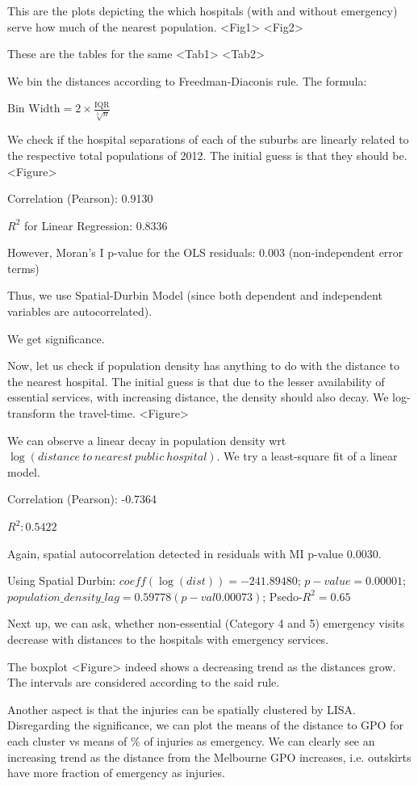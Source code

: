 \documentclass[
	a4paper, %
	10pt, %
	unnumberedsections, %
	twoside, %
]{LTJournalArticle}
\begin{document}
This are the plots depicting the which hospitals (with and without emergency) serve how much of the nearest population. <Fig1> <Fig2>

These are the tables for the same <Tab1> <Tab2>

We bin the distances according to Freedman-Diaconis rule. The formula:

$\text{Bin Width} = 2 \times \frac{\text{IQR}}{\sqrt[3]{n}}$




We check if the hospital separations of each of the suburbs are linearly related to the respective total populations of 2012. The initial guess is that they should be. <Figure>

Correlation (Pearson): 0.9130

$R^2$ for Linear Regression: 0.8336

However, Moran's I p-value for the OLS residuals: 0.003 (non-independent error terms)

Thus, we use Spatial-Durbin Model (since both dependent and independent variables are autocorrelated). 

We get significance.

Now, let us check if population density has anything to do with the distance to the nearest hospital. The initial guess is that due to the lesser availability of essential services, with increasing distance, the density should also decay. We log-transform the travel-time. <Figure>

We can observe a linear decay in population density wrt $\log(distance \ to \ nearest \ public \ hospital)$. We try a least-square fit of a linear model. 

Correlation (Pearson): -0.7364

$R^2: 0.5422$

Again, spatial autocorrelation detected in residuals with MI p-value 0.0030.

Using Spatial Durbin: $coeff(\log(dist))=-241.89480$; $p-value=0.00001$; $population\_density\_lag= 0.59778 (p-val 0.00073)$; Psedo-$R^2=0.65$

Next up, we can ask, whether non-essential (Category 4 and 5) emergency visits decrease with distances to the hospitals with emergency services.

The boxplot <Figure> indeed shows a decreasing trend as the distances grow. The intervals are considered according to the said rule.


Another aspect is that the injuries can be spatially clustered by LISA. Disregarding the significance, we can plot the means of the distance to GPO for each cluster vs means of \% of injuries as emergency. We can clearly see an increasing trend as the distance from the Melbourne GPO increases, i.e. outskirts have more fraction of emergency as injuries.
\end{document}
